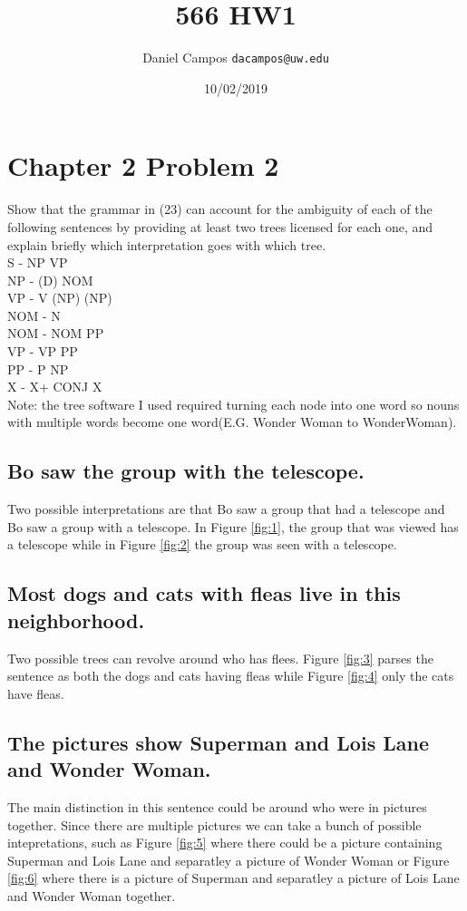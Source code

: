 \documentclass{article}
\begin{document}
\title{566 HW1}
\author{Daniel Campos  \tt {dacampos@uw.edu}}
\date{10/02/2019}
\maketitle 
\section{Chapter 2 Problem 2}
Show that the grammar in (23) can account for the ambiguity of each of the following
sentences by providing at least two trees licensed for each one, and explain briefly which
interpretation goes with which tree. \\
S - NP VP \\
NP - (D) NOM \\
VP - V (NP) (NP) \\
NOM - N \\
NOM - NOM PP \\
VP - VP PP \\
PP - P NP \\
X - X+ CONJ X \\
Note: the tree software I used required turning each node into one word so nouns with multiple words become one word(E.G. Wonder Woman to WonderWoman).
\subsection{Bo saw the group with the telescope.}
Two possible interpretations are that Bo saw a group that had a telescope and Bo saw a group with a telescope. In Figure  \ref{fig:1}, the group that was viewed has a telescope while in Figure  \ref{fig:2} the group was seen with a telescope.
\subsection{Most dogs and cats with fleas live in this neighborhood.}
Two possible trees can revolve around who has flees. Figure  \ref{fig:3} parses the sentence as both the dogs and cats having fleas while Figure  \ref{fig:4} only the cats have fleas.
\subsection{The pictures show Superman and Lois Lane and Wonder Woman.}
The main distinction in this sentence could be around who were in pictures together. Since there are multiple pictures we can take a bunch of possible intepretations, such as Figure  \ref{fig:5} where there could be a picture containing Superman and Lois Lane and separatley a picture of Wonder Woman or Figure  \ref{fig:6} where there is a picture of Superman and separatley a picture of Lois Lane and Wonder Woman together.
\\
\end{document}
